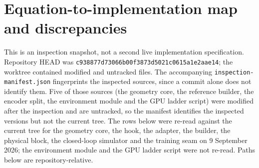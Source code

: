 \documentclass[11pt,a4paper]{article}
\newcommand{\code}[1]{\nolinkurl{#1}}
\theoremstyle{remark}
\begin{document}
\section{Equation-to-implementation map and discrepancies}\label{sec:implementation}
This is an inspection snapshot, not a second live implementation specification. Repository HEAD was \code{c938877d73066b00f3873d5021c0615a1e2aae14}; the worktree contained modified and untracked files. The accompanying \code{inspection-manifest.json} fingerprints the inspected sources, since a commit alone does not identify them. Five of those sources (the geometry core, the reference builder, the encoder split, the environment module and the GPU ladder script) were modified after the inspection and are untracked, so the manifest identifies the inspected versions but not the current tree. The rows below were re-read against the current tree for the geometry core, the hook, the adapter, the builder, the physical block, the closed-loop simulator and the training seam on 9 September 2026; the environment module and the GPU ladder script were not re-read. Paths below are repository-relative.
\end{document}
